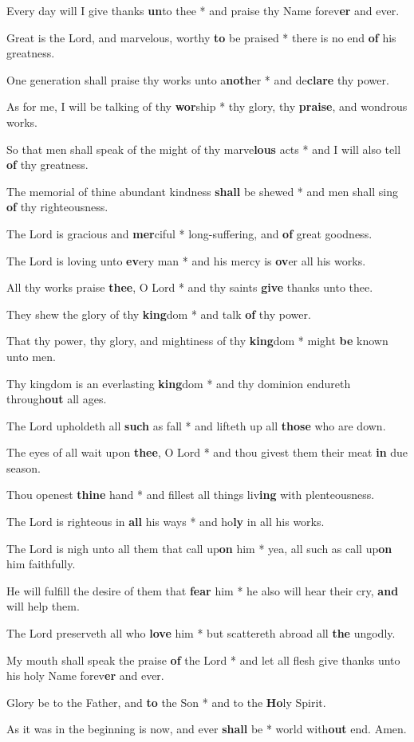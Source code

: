 \begin{multicols}{2}
	Every day will I give thanks \textbf{un}to thee * and praise thy Name forev\textbf{er} and ever.
	
	Great is the Lord, and marvelous, worthy \textbf{to} be praised * there is no end \textbf{of} his greatness.
	
	One generation shall praise thy works unto a\textbf{noth}er * and de\textbf{clare} thy power.
	
	As for me, I will be talking of thy \textbf{wor}ship * thy glory, thy \textbf{praise}, and wondrous works.
	
	So that men shall speak of the might of thy marve\textbf{lous} acts * and I will also tell \textbf{of} thy greatness.
	
	The memorial of thine abundant kindness \textbf{shall} be shewed * and men shall sing \textbf{of} thy righteousness.
	
	The Lord is gracious and \textbf{mer}ciful * long-suffering, and \textbf{of} great goodness.
	
	The Lord is loving unto \textbf{ev}ery man * and his mercy is \textbf{ov}er all his works.
	
	All thy works praise \textbf{thee}, O Lord * and thy saints \textbf{give} thanks unto thee.
	
	They shew the glory of thy \textbf{king}dom * and talk \textbf{of} thy power.
	
	That thy power, thy glory, and mightiness of thy \textbf{king}dom * might \textbf{be} known unto men.
	
	Thy kingdom is an everlasting \textbf{king}dom * and thy dominion endureth through\textbf{out} all ages.
	
	The Lord upholdeth all \textbf{such} as fall * and lifteth up all \textbf{those} who are down.
	
	The eyes of all wait upon \textbf{thee}, O Lord * and thou givest them their meat \textbf{in} due season.
	
	Thou openest \textbf{thine} hand * and fillest all things liv\textbf{ing} with plenteousness.
	
	The Lord is righteous in \textbf{all} his ways * and ho\textbf{ly} in all his works.
	
	The Lord is nigh unto all them that call up\textbf{on} him * yea, all such as call up\textbf{on} him faithfully.
	
	He will fulfill the desire of them that \textbf{fear} him * he also will hear their cry, \textbf{and} will help them.
	
	The Lord preserveth all who \textbf{love} him * but scattereth abroad all \textbf{the} ungodly.
	
	My mouth shall speak the praise \textbf{of} the Lord * and let all flesh give thanks unto his holy Name forev\textbf{er} and ever.
	
	Glory be to the Father, and \textbf{to} the Son * and to the \textbf{Ho}ly Spirit.
	
	As it was in the beginning is now, and ever \textbf{shall} be * world with\textbf{out} end. Amen.
\end{multicols}